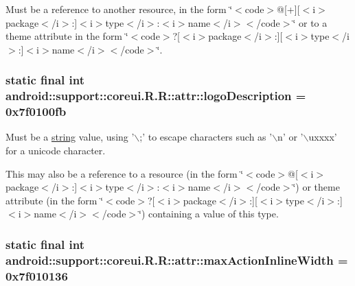 Must be a reference to another resource, in the form \char`\"{}$<$code$>$@\mbox{[}+\mbox{]}\mbox{[}$<$i$>$package$<$/i$>$:\mbox{]}$<$i$>$type$<$/i$>$:$<$i$>$name$<$/i$>$$<$/code$>$\char`\"{} or to a theme attribute in the form \char`\"{}$<$code$>$?\mbox{[}$<$i$>$package$<$/i$>$:\mbox{]}\mbox{[}$<$i$>$type$<$/i$>$:\mbox{]}$<$i$>$name$<$/i$>$$<$/code$>$\char`\"{}. \hypertarget{classandroid_1_1support_1_1coreui_1_1_r_1_1attr_3f06b053bec6c7ef1d984e35d64b1e9d}{
\subsubsection[{logoDescription}]{\setlength{\rightskip}{0pt plus 5cm}static final int android::support::coreui.R.R::attr::logoDescription = 0x7f0100fb}}
\label{classandroid_1_1support_1_1coreui_1_1_r_1_1attr_3f06b053bec6c7ef1d984e35d64b1e9d}


Must be a \hyperlink{classandroid_1_1support_1_1coreui_1_1_r_1_1string}{string} value, using '$\backslash$;' to escape characters such as '$\backslash$n' or '$\backslash$uxxxx' for a unicode character. 

This may also be a reference to a resource (in the form \char`\"{}$<$code$>$@\mbox{[}$<$i$>$package$<$/i$>$:\mbox{]}$<$i$>$type$<$/i$>$:$<$i$>$name$<$/i$>$$<$/code$>$\char`\"{}) or theme attribute (in the form \char`\"{}$<$code$>$?\mbox{[}$<$i$>$package$<$/i$>$:\mbox{]}\mbox{[}$<$i$>$type$<$/i$>$:\mbox{]}$<$i$>$name$<$/i$>$$<$/code$>$\char`\"{}) containing a value of this type. \hypertarget{classandroid_1_1support_1_1coreui_1_1_r_1_1attr_9a6dd728c47ca9cddf62456c84f687ec}{
\subsubsection[{maxActionInlineWidth}]{\setlength{\rightskip}{0pt plus 5cm}static final int android::support::coreui.R.R::attr::maxActionInlineWidth = 0x7f010136}}
\label{classandroid_1_1support_1_1coreui_1_1_r_1_1attr_9a6dd728c47ca9cddf62456c84f687ec}


